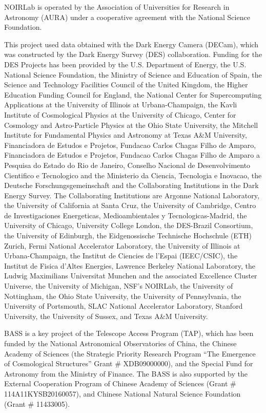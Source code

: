 \documentclass[a4paper,11pt]{article}
\begin{document}
    NOIRLab is operated by the Association of Universities for Research in Astronomy (AURA) under a cooperative agreement with the National Science Foundation.
    
    This project used data obtained with the Dark Energy Camera (DECam), which was constructed by the Dark Energy Survey (DES) collaboration. Funding for the DES Projects has been provided by the U.S. Department of Energy, the U.S. National Science Foundation, the Ministry of Science and Education of Spain, the Science and Technology Facilities Council of the United Kingdom, the Higher Education Funding Council for England, the National Center for Supercomputing Applications at the University of Illinois at Urbana-Champaign, the Kavli Institute of Cosmological Physics at the University of Chicago, Center for Cosmology and Astro-Particle Physics at the Ohio State University, the Mitchell Institute for Fundamental Physics and Astronomy at Texas A\&M University, Financiadora de Estudos e Projetos, Fundacao Carlos Chagas Filho de Amparo, Financiadora de Estudos e Projetos, Fundacao Carlos Chagas Filho de Amparo a Pesquisa do Estado do Rio de Janeiro, Conselho Nacional de Desenvolvimento Cientifico e Tecnologico and the Ministerio da Ciencia, Tecnologia e Inovacao, the Deutsche Forschungsgemeinschaft and the Collaborating Institutions in the Dark Energy Survey. The Collaborating Institutions are Argonne National Laboratory, the University of California at Santa Cruz, the University of Cambridge, Centro de Investigaciones Energeticas, Medioambientales y Tecnologicas-Madrid, the University of Chicago, University College London, the DES-Brazil Consortium, the University of Edinburgh, the Eidgenossische Technische Hochschule (ETH) Zurich, Fermi National Accelerator Laboratory, the University of Illinois at Urbana-Champaign, the Institut de Ciencies de l'Espai (IEEC/CSIC), the Institut de Fisica d'Altes Energies, Lawrence Berkeley National Laboratory, the Ludwig Maximilians Universitat Munchen and the associated Excellence Cluster Universe, the University of Michigan, NSF's NOIRLab, the University of Nottingham, the Ohio State University, the University of Pennsylvania, the University of Portsmouth, SLAC National Accelerator Laboratory, Stanford University, the University of Sussex, and Texas A\&M University.
    
    BASS is a key project of the Telescope Access Program (TAP), which has been funded by the National Astronomical Observatories of China, the Chinese Academy of Sciences (the Strategic Priority Research Program “The Emergence of Cosmological Structures” Grant \# XDB09000000), and the Special Fund for Astronomy from the Ministry of Finance. The BASS is also supported by the External Cooperation Program of Chinese Academy of Sciences (Grant \# 114A11KYSB20160057), and Chinese National Natural Science Foundation (Grant \# 11433005).
    
\end{document}
